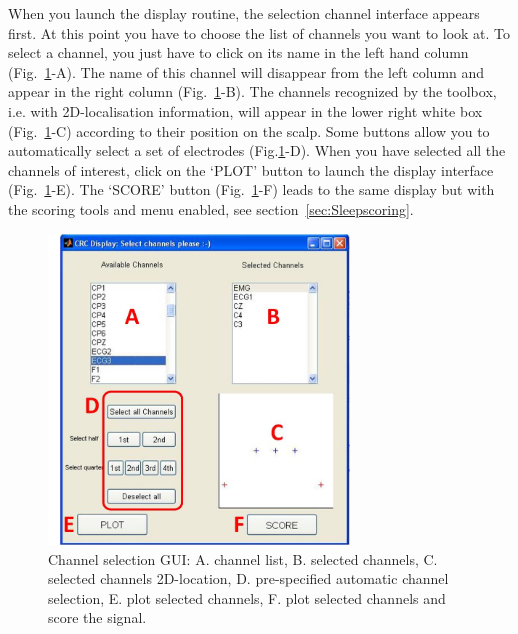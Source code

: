 \documentclass[a4paper,titlepage]{article}
\begin{document}
When you launch the display routine, the selection channel interface appears first. At this point you have to choose the list of channels you want to look at. To select a channel, you just have to click on its name in the left hand column (Fig.~\ref{fig:TB_disselchan}-A). The name of this channel will disappear from the left column and appear in the right column (Fig.~\ref{fig:TB_disselchan}-B). The channels recognized by the toolbox, i.e. with 2D-localisation information, will appear in the lower right white box (Fig.~\ref{fig:TB_disselchan}-C) according to their position on the scalp. Some buttons allow you to automatically select a set of electrodes (Fig.\ref{fig:TB_disselchan}-D). When you have selected all the channels of interest, click on the `PLOT' button to launch the display interface (Fig.~\ref{fig:TB_disselchan}-E). The `SCORE' button (Fig.~\ref{fig:TB_disselchan}-F) leads to the same display but with the scoring tools and menu enabled, see section~\ref{sec:Sleepscoring}.
\begin{figure}[ht]
	\centering
		\includegraphics[width=8cm]{images/FIG2_dis_selchan.jpg}
	\caption{Channel selection GUI: A. channel list, B. selected channels, C. selected channels 2D-location, D. pre-specified automatic channel selection, E. plot selected channels, F. plot selected channels and score the signal.
	\label{fig:TB_disselchan}}
\end{figure}	
\end{document}
